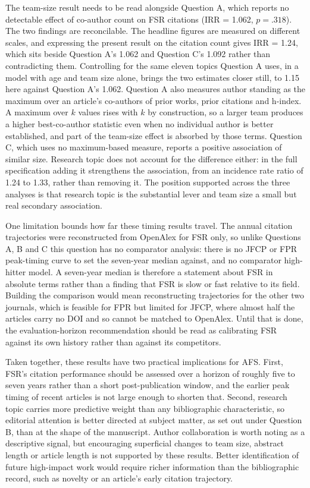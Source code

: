 \documentclass[11pt,a4paper]{article}
\begin{document}
The team-size result needs to be read alongside Question A, which reports no detectable effect of co-author count on FSR citations (IRR = 1.062, $p = .318$). The two findings are reconcilable. The headline figures are measured on different scales, and expressing the present result on the citation count gives IRR = 1.24, which sits beside Question A's 1.062 and Question C's 1.092 rather than contradicting them. Controlling for the same eleven topics Question A uses, in a model with age and team size alone, brings the two estimates closer still, to 1.15 here against Question A's 1.062. Question A also measures author standing as the maximum over an article's co-authors of prior works, prior citations and h-index. A maximum over $k$ values rises with $k$ by construction, so a larger team produces a higher best-co-author statistic even when no individual author is better established, and part of the team-size effect is absorbed by those terms. Question C, which uses no maximum-based measure, reports a positive association of similar size. Research topic does not account for the difference either: in the full specification adding it strengthens the association, from an incidence rate ratio of 1.24 to 1.33, rather than removing it. The position supported across the three analyses is that research topic is the substantial lever and team size a small but real secondary association.

One limitation bounds how far these timing results travel. The annual citation trajectories were reconstructed from OpenAlex for FSR only, so unlike Questions A, B and C this question has no comparator analysis: there is no JFCP or FPR peak-timing curve to set the seven-year median against, and no comparator high-hitter model. A seven-year median is therefore a statement about FSR in absolute terms rather than a finding that FSR is slow or fast relative to its field. Building the comparison would mean reconstructing trajectories for the other two journals, which is feasible for FPR but limited for JFCP, where almost half the articles carry no DOI and so cannot be matched to OpenAlex. Until that is done, the evaluation-horizon recommendation should be read as calibrating FSR against its own history rather than against its competitors.

Taken together, these results have two practical implications for AFS. First, FSR's citation performance should be assessed over a horizon of roughly five to seven years rather than a short post-publication window, and the earlier peak timing of recent articles is not large enough to shorten that. Second, research topic carries more predictive weight than any bibliographic characteristic, so editorial attention is better directed at subject matter, as set out under Question B, than at the shape of the manuscript. Author collaboration is worth noting as a descriptive signal, but encouraging superficial changes to team size, abstract length or article length is not supported by these results. Better identification of future high-impact work would require richer information than the bibliographic record, such as novelty or an article's early citation trajectory.
\end{document}
